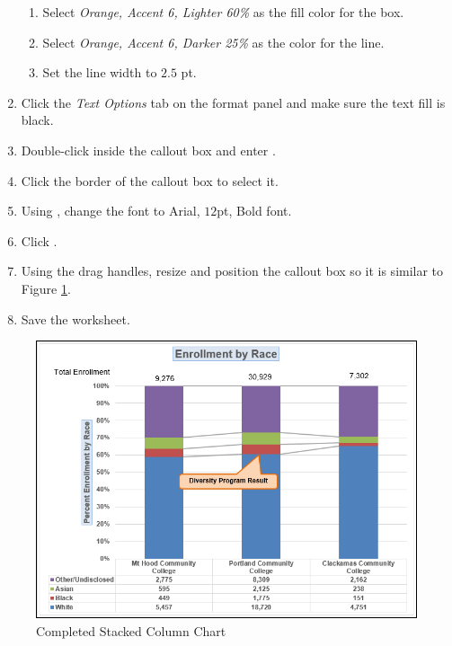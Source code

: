 \begin{enumerate}
	\begin{enumerate}
		\item Select \textit{Orange, Accent 6, Lighter 60\%} as the fill color for the box.
		\item Select \textit{Orange, Accent 6, Darker 25\%} as the color for the line.
		\item Set the line width to $ 2.5 $ pt.
	\end{enumerate}
	
	\item Click the \textit{Text Options} tab on the format panel and make sure the text fill is black.
	\item Double-click inside the callout box and enter .
	\item Click the border of the callout box to select it.
	\item Using , change the font to Arial, $ 12 $pt, Bold font. 
	\item Click .
	\item Using the drag handles, resize and position the callout box so it is similar to Figure \ref{04:fig45}.
	\item Save the worksheet.
\end{enumerate}

\begin{figure}[H]
	\centering
	\includegraphics[width=\maxwidth{.95\linewidth}]{gfx/ch04_fig45}
	\caption{Completed Stacked Column Chart}
	\label{04:fig45}
\end{figure}

